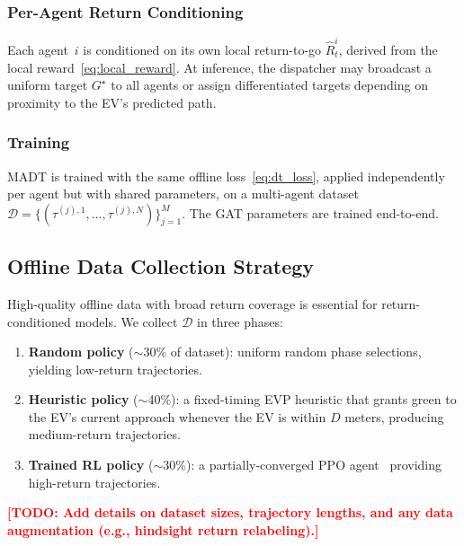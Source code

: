 \documentclass[journal]{IEEEtran}
\newcommand{\todo}[1]{\textcolor{red}{\textbf{[TODO: #1]}}}
\newcommand{\Rtg}{\widehat{R}}
\begin{document}
\subsubsection{Per-Agent Return Conditioning}
Each agent~$i$ is conditioned on its own local return-to-go
$\Rtg_t^i$, derived from the local reward~\eqref{eq:local_reward}.
At inference, the dispatcher may broadcast a uniform target
$G^\star$ to all agents or assign differentiated targets depending on
proximity to the EV's predicted path.

\subsubsection{Training}
MADT is trained with the same offline loss~\eqref{eq:dt_loss},
applied independently per agent but with shared parameters, on a
multi-agent dataset $\mathcal{D} = \{(\tau^{(j),1}, \ldots,
\tau^{(j),N})\}_{j=1}^M$.  The GAT parameters are trained
end-to-end.

\subsection{Offline Data Collection Strategy}
\label{sec:method:data}

High-quality offline data with broad return coverage is essential for
return-conditioned models.  We collect $\mathcal{D}$ in three phases:

\begin{enumerate}
  \item \textbf{Random policy} ($\sim$30\% of dataset): uniform random
    phase selections, yielding low-return trajectories.
  \item \textbf{Heuristic policy} ($\sim$40\%): a fixed-timing EVP
    heuristic that grants green to the EV's current approach whenever
    the EV is within $D$ meters, producing medium-return trajectories.
  \item \textbf{Trained RL policy} ($\sim$30\%): a partially-converged
    PPO agent~\cite{schulman2017proximal} providing high-return
    trajectories.
\end{enumerate}

\todo{Add details on dataset sizes, trajectory lengths, and any data
augmentation (e.g., hindsight return relabeling).}

\end{document}
